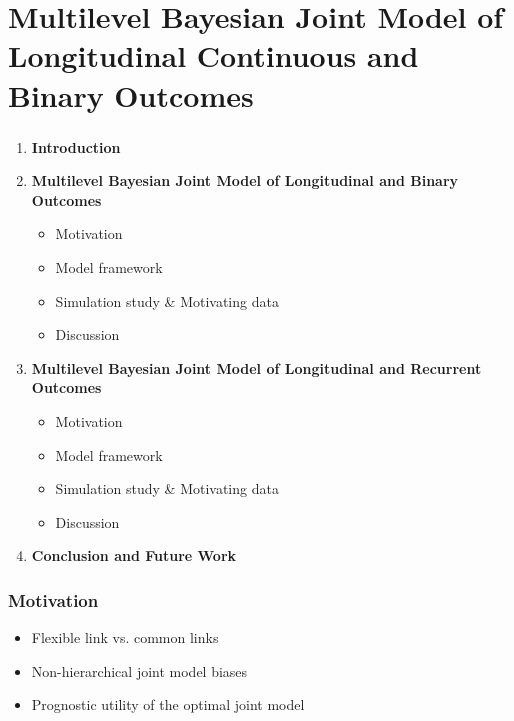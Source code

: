 \documentclass[fleqn]{beamer}
\begin{document}
\section[Project I: Binary Outcome]{Multilevel Bayesian Joint Model of Longitudinal Continuous and Binary Outcomes}
\setcounter{subsection}{1}

\begin{frame}
\frametitle{}
\begin{enumerate}
    \item<0> \textbf{Introduction}
    \item \textbf{Multilevel Bayesian Joint Model of Longitudinal and Binary Outcomes}
    \begin{itemize}
        \item Motivation
        \item Model framework
        \item Simulation study \& Motivating data
        \item Discussion
    \end{itemize}
    \item<0> \textbf{Multilevel Bayesian Joint Model of Longitudinal and Recurrent Outcomes}
    \begin{itemize}
        \item Motivation
        \item Model framework
        \item Simulation study \& Motivating data
        \item Discussion
    \end{itemize}
    \item<0> \textbf{Conclusion and Future Work}
\end{enumerate}
\end{frame}

\begin{frame}
\frametitle{Motivation}
\begin{itemize}
    \item Flexible link vs. common links
    \item Non-hierarchical joint model biases
    \item Prognostic utility of the optimal joint model
\end{itemize}
\end{frame}
\end{document}
